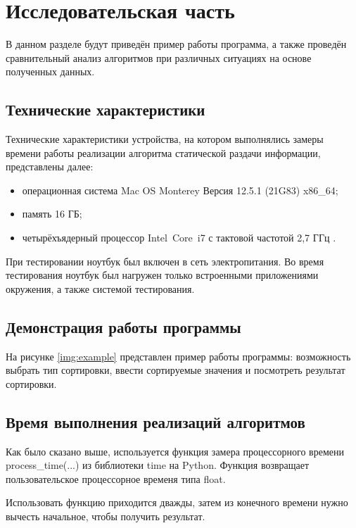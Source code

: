 \chapter{Исследовательская часть}

В данном разделе будут приведён пример работы программа, а также проведён сравнительный анализ алгоритмов при различных ситуациях на основе полученных данных.

\section{Технические характеристики}

Технические характеристики устройства, на котором выполнялись замеры времени работы реализации алгоритма статической раздачи информации, представлены далее:

\begin{itemize}[label=---]
	\item операционная система Mac OS Monterey Версия 12.5.1 (21G83) \cite{macos} x86\_64;
	\item память 16 ГБ;
	\item четырёхъядерный процессор Intel Core i7 с тактовой частотой 2,7 ГГц \cite{intel}.
\end{itemize}

При тестировании ноутбук был включен в сеть электропитания. Во время тестирования ноутбук был нагружен только встроенными приложениями окружения, а также системой тестирования.

\section{Демонстрация работы программы}

На рисунке \ref{img:example} представлен пример работы программы: возможность выбрать тип сортировки, ввести сортируемые значения и посмотреть результат сортировки.

\clearpage

\section{Время выполнения реализаций алгоритмов}

Как было сказано выше, используется функция замера процессорного времени process\_time(...) из библиотеки time на Python. Функция возвращает пользовательское процессорное временя типа float.

Использовать функцию приходится дважды, затем из конечного времени нужно вычесть начальное, чтобы получить результат.

